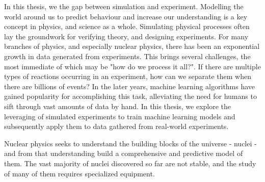 \noindent In this thesis, we the gap between simulation and experiment.
Modelling the world around us to predict behaviour and increase our understanding is a key concept
in physics, and science as a whole. Simulating physical processes often lay the groundwork for verifying
theory, and designing experiments. For many branches of physics, and especially nuclear physics,
there has been an exponential growth in data generated from experiments. This brings several challenges,
the most immediate of which may be "how do we process it all?". If there are multiple types of
reactions occurring in an experiment, how can we separate them when there are billions of events?
In the later years, machine learning algorithms have gained popularity for accomplishing this task,
alleviating the need for humans to sift through vast amounts of data by hand. In this thesis, we
explore the leveraging of simulated experiments to train machine learning models and subsequently
apply them to data gathered from real-world experiments. 



Nuclear physics seeks to understand the building blocks of the universe - nuclei - and from that 
understanding build a comprehensive and predictive model of them. The vast majority of nuclei discovered 
so far are not stable, and the study of many of them requires specialized equipment.


